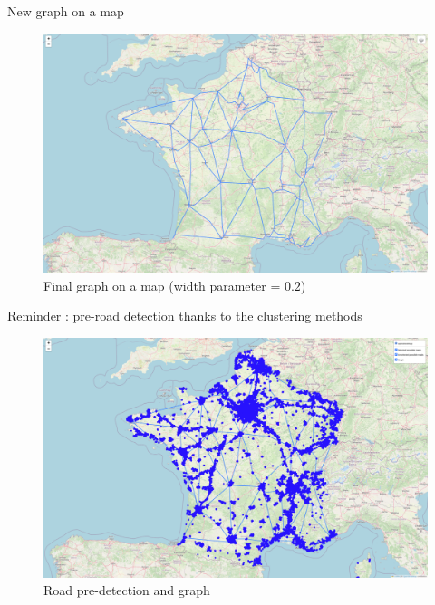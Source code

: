 \begin{frame}{New graph on a map}
    \begin{figure}
        \includegraphics[height=0.6\paperheight]{images/road_detection/final graph on map.png}
        \caption{Final graph on a map (width parameter = $0.2$)}
    \end{figure}
\end{frame}

\begin{frame}{Reminder : pre-road detection thanks to the clustering methods}
    \begin{figure}
        \includegraphics[height=0.6\paperheight]{images/road_detection/road-predetection and graph.png}
        \caption{Road pre-detection and graph}
    \end{figure}
\end{frame}

